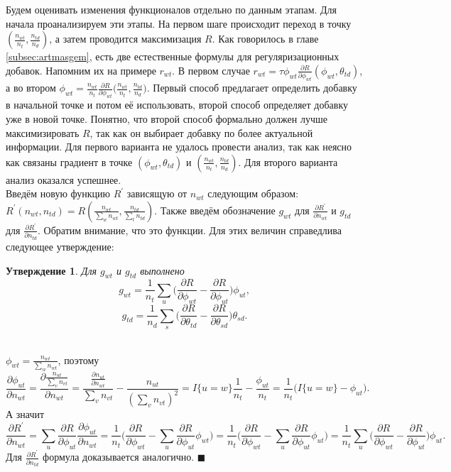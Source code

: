 \documentclass[12pt]{article}
\newtheorem{claim}[remark]{Утверждение}
\newenvironment{Proof} 
	{\par\noindent{\bf Доказательство.}} 
	{\hfill$\blacksquare$}
\begin{document}
Будем оценивать изменения функционалов отдельно по данным этапам. Для начала проанализируем эти этапы. На первом шаге происходит переход в точку $\left(\frac{n_{wt}}{n_t}, \frac{n_{td}}{n_d}\right)$, а затем проводится максимизация $R$. Как говорилось в главе \ref{subsec:artmasgem}, есть две естественные формулы для регуляризационных добавок. Напомним их на примере $r_{wt}$. В первом случае $r_{wt} = \tau\phi_{wt} \frac{\partial{R}}{\partial{\phi_{wt}}} \left( \phi_{wt}, \theta_{td}\right)$, а во втором $\phi_{wt} = \frac{n_{wt}}{n_t} \frac{\partial{R}}{\partial{\phi_{wt}}} \big(\frac{n_{wt}}{n_t}, \frac{n_{td}}{n_d}\big)$. Первый способ предлагает определить добавку в начальной точке и потом её использовать, второй способ определяет добавку уже в новой точке. Понятно, что второй способ формально должен лучше максимизировать $R$, так как он выбирает добавку по более актуальной информации. Для первого варианта не удалось провести анализ, так как неясно как связаны градиент в точке $(\phi_{wt}, \theta_{td})$ и $\left(\frac{n_{wt}}{n_t}, \frac{n_{td}}{n_d}\right)$. Для второго варианта анализ оказался успешнее.\\
Введём новую функцию $R^{\prime}$ зависящую от $n_{wt}$ следующим образом: $R^{\prime}(n_{wt}, n_{td}) = R\left( \frac{n_{wt}}{\sum\limits_w n_{wt}},  \frac{n_{td}}{\sum\limits_t n_{td}}\right)$. Также введём обозначение $g_{wt}$ для $\frac{\partial{R^{\prime}}}{\partial{n_{wt}}}$ и $g_{td}$ для $\frac{\partial{R^{\prime}}}{\partial{n_{td}}}$. Обратим внимание, что это функции. Для этих величин справедлива следующее утверждение:
\begin{claim}
\label{claimgradientvalue}           
Для $g_{wt}$ и $g_{td}$ выполнено
\[
g_{wt} = \frac{1}{n_t} \sum_{u} \bigg(\frac{\partial{R}}{\partial{\phi_{wt}}}  -  \frac{\partial{R}}{\partial{\phi_{ut}}} \bigg)  \phi_{ut} ,
\]
\[
g_{td} = \frac{1}{n_d} \sum_{s} \bigg(\frac{\partial{R}}{\partial{\theta_{td}}}  -  \frac{\partial{R}}{\partial{\theta_{sd}}} \bigg)  \theta_{sd} .
\]
\end{claim}
\begin{Proof}\\
$\phi_{wt} = \frac{n_{wt}}{\sum_w n_{wt}}$, поэтому
\[
\frac{\partial{\phi_{ut}}}{\partial{n_{wt}}} = \frac{\partial{ \frac{n_{ut}}{\sum\limits_v n_{vt}}}}{\partial{n_{wt}}} = \frac{ \frac{\partial{n_{ut}}}{\partial{n_{wt}}}}{\sum\limits_v n_{vt}} - \frac{n_{ut}}{(\sum\limits_v n_{vt})^2} = I\{u = w\} \frac{1}{n_t} - \frac{\phi_{ut}}{n_t} = \frac{1}{n_t}\bigg( 
 I\{u = w\} - \phi_{ut} \bigg).
\]
А значит
\[
\frac{\partial{R^{\prime}}}{\partial{n_{wt}}} = \sum_{u} \frac{\partial{R}}{\partial{\phi_{ut}}} \frac{\partial{\phi_{ut}}}{\partial{n_{wt}}} = \frac{1}{n_t} \bigg( \frac{\partial{R}}{\partial{\phi_{wt}}} - \sum_{u}  \frac{\partial{R}}{\partial{\phi_{ut}}} \phi_{wt} \bigg) = \frac{1}{n_t} \bigg( \frac{\partial{R}}{\partial{\phi_{wt}}} - \sum_{u}  \frac{\partial{R}}{\partial{\phi_{ut}}} \phi_{ut} \bigg) = \frac{1}{n_t} \sum_{u} \bigg(\frac{\partial{R}}{\partial{\phi_{wt}}}  -  \frac{\partial{R}}{\partial{\phi_{ut}}} \bigg)  \phi_{ut}.
\]
Для $\frac{\partial{R^{\prime}}}{\partial{n_{td}}}$ формула доказывается аналогично.
\end{Proof}\\
\end{document}

